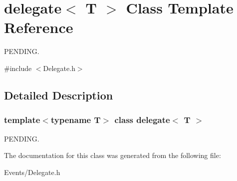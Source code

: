 \hypertarget{classdelegate}{}\section{delegate$<$ T $>$ Class Template Reference}
\label{classdelegate}


P\+E\+N\+D\+I\+NG.  




{\ttfamily \#include $<$Delegate.\+h$>$}



\subsection{Detailed Description}
\subsubsection*{template$<$typename T$>$\newline
class delegate$<$ T $>$}

P\+E\+N\+D\+I\+NG. 

The documentation for this class was generated from the following file\+:\begin{DoxyCompactItemize}
\item 
Events/Delegate.\+h\end{DoxyCompactItemize}
